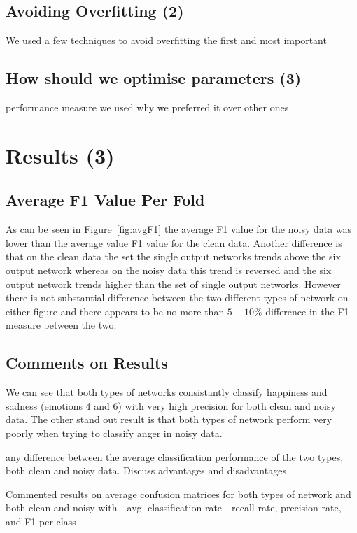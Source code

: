 \documentclass[10pt,a4paper]{article}
\begin{document}
\subsection{Avoiding Overfitting (2)}
We used a few techniques to avoid overfitting the first and most important 

\subsection{How should we optimise parameters (3)}
performance measure we used why we preferred it over other ones

\section{Results (3)}

\subsection{Average F1 Value Per Fold}
As can be seen in Figure~\ref{fig:avgF1} the average F1 value for the noisy data was lower than the average value F1 value for the clean data. Another difference is that on the clean data the set the single output networks trends above the six output network whereas on the noisy data this trend is reversed and the six output network trends higher than the set of single output networks. However there is not substantial difference between the two different types of network on either figure and there appears to be no more than $5-10\%$ difference in the F1 measure between the two.

\subsection{Comments on Results}

We can see that both types of networks consistantly classify happiness and sadness (emotions 4 and 6) with very high precision for both clean and noisy data. The other stand out result is that both types of network perform very poorly when trying to classify anger in noisy data.

any difference between the average classification performance of the two types, both clean and noisy data. Discuss advantages and disadvantages

Commented results on average confusion matrices for both types of network and both clean and noisy with 
	- avg. classification rate
	- recall rate, precision rate, and F1 per class
\end{document}
